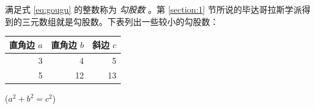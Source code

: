 \documentclass[UTF8]{ctexart}
\begin{document}
满足式 \eqref{eq:gougu} 的整数称为 \emph{勾股数} 。第 \ref{section:1} 节所说的毕达哥拉斯学派得到的三元数组就是勾股数。下表列出一些较小的勾股数：

\begin{table}[H]
\begin{tabular}{|rrr|}
\hline
直角边 $a$ & 直角边 $b$ & 斜边 $c$ \\
\hline
	3	&		4	&		5 \\
	5	&		12 	&		13 \\
\hline 
\end{tabular}%
\qquad
($a^2 + b^2 = c^2$)
\end{table}

\nocite{Shiye}

\end{document}
